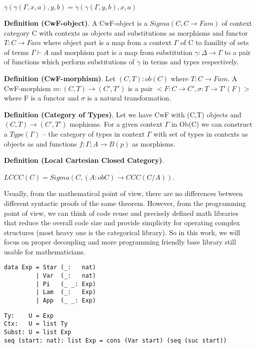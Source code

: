 \documentclass{article}
\begin{document}
        $\gamma(\gamma(\Gamma,x,a),y,b) = \gamma(\gamma(\Gamma,y,b),x,a)$

{\bf Definition (CwF-object)}. A CwF-object is a $Sigma(C,C\rightarrow Fam)$
of context category C with contexts as objects and
substitutions as morphisms and functor $T:C\rightarrow Fam$ where
object part is a map from a context $\Gamma$ of C to famility
of sets of terms $\Gamma\vdash A$ and morphism part is a map from
substitution $\gamma:\Delta\rightarrow\Gamma$ to a pair of functions which perform
substitutions of $\gamma$ in terms and types respectively.

{\bf Definition (CwF-morphism)}. Let $(C,T):ob(C)$ where $T:C\rightarrow Fam$.
A CwF-morphism $m: (C,T)\rightarrow(C',T')$ is a pair $<F:C\rightarrow C',\sigma:T\rightarrow T'(F)>$
where F is a functor and $\sigma$ is a natural transformation.

{\bf Definition (Category of Types)}. Let we have CwF with (C,T) objects
and $(C,T)\rightarrow(C',T')$ mophisms. For a given context $\Gamma$ in Ob(C) we can
construct a $Type(\Gamma)$ -- the category of types in context $\Gamma$ with
set of types in contexts as objects as and functions
$f:\Gamma;A\rightarrow B(p)$ as morphisms.

{\bf Definition (Local Cartesian Closed Category)}.

          $LCCC(C) = Sigma(C,(A:ob C)\rightarrow CCC(C/A))$.

Usually, from the mathematical point of view, there are no differences between
different syntactic proofs of the same theorem. However, from the programming point of view, we can think of code reuse and precisely defined math libraries that reduce
the overall code size and provide simplicity for operating complex
structures (most heavy one is the categorical library). So in this work, we will focus
on proper decoupling and more programming friendly base library still usable
for mathematicians.


\begin{lstlisting}[mathescape=true]
data Exp = Star (_:   nat)
         | Var  (_:   nat)
         | Pi   (_ _: Exp)
         | Lam  (_:   Exp)
         | App  (_ _: Exp)
\end{lstlisting}

\begin{lstlisting}[mathescape=true]
Ty:    U = Exp
Ctx:   U = list Ty
Subst: U = list Exp
seq (start: nat): list Exp = cons (Var start) (seq (suc start))
\end{lstlisting}
\end{document}

